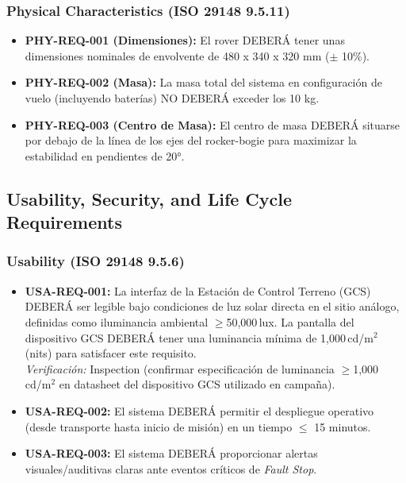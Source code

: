 \subsubsection{Physical Characteristics (ISO 29148 9.5.11)}
\begin{itemize}
    \item \textbf{PHY-REQ-001 (Dimensiones):} El rover DEBERÁ tener unas dimensiones nominales de envolvente de 480 x 340 x 320 mm ($\pm$ 10\%).
    \item \textbf{PHY-REQ-002 (Masa):} La masa total del sistema en configuración de vuelo (incluyendo baterías) NO DEBERÁ exceder los 10 kg.
    \item \textbf{PHY-REQ-003 (Centro de Masa):} El centro de masa DEBERÁ situarse por debajo de la línea de los ejes del rocker-bogie para maximizar la estabilidad en pendientes de 20°.
\end{itemize}

\subsection{Usability, Security, and Life Cycle Requirements}

\subsubsection{Usability (ISO 29148 9.5.6)}
\begin{itemize}
    \item \textbf{USA-REQ-001:} La interfaz de la Estación de Control Terreno (GCS) DEBERÁ ser legible bajo condiciones de luz solar directa en el sitio análogo, definidas como iluminancia ambiental $\ge$50{,}000\,lux. La pantalla del dispositivo GCS DEBERÁ tener una luminancia mínima de 1{,}000\,cd/m$^2$ (nits) para satisfacer este requisito. \cite{display_brightness_outdoor} \\
    \textit{Verificación:} Inspection (confirmar especificación de luminancia $\ge$1{,}000\,cd/m$^2$ en datasheet del dispositivo GCS utilizado en campaña).
    \item \textbf{USA-REQ-002:} El sistema DEBERÁ permitir el despliegue operativo (desde transporte hasta inicio de misión) en un tiempo $\le$ 15 minutos.
    \item \textbf{USA-REQ-003:} El sistema DEBERÁ proporcionar alertas visuales/auditivas claras ante eventos críticos de \emph{Fault Stop}.
\end{itemize}

